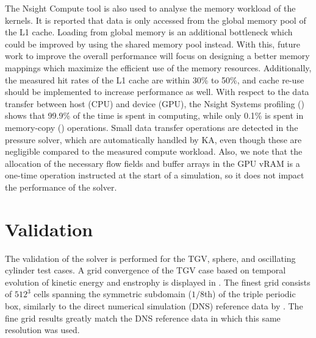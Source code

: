 \documentclass[10pt,a4paper]{article}
\begin{document}
The Nsight Compute tool is also used to analyse the memory workload of the kernels. It is reported that data is only accessed from the global memory pool of the L1 cache. Loading from global memory is an additional bottleneck which could be improved by using the shared memory pool instead. With this, future work to improve the overall performance will focus on designing a better memory mappings which maximize the efficient use of the memory resources. Additionally, the measured hit rates of the L1 cache are within 30\% to 50\%, and cache re-use should be implemented to increase performance as well. With respect to the data transfer between host (CPU) and device (GPU), the Nsight Systems profiling () shows that 99.9\% of the time is spent in computing, while only 0.1\% is spent in memory-copy () operations. Small data transfer operations are detected in the pressure solver, which are automatically handled by KA, even though these are negligible compared to the measured compute workload. Also, we note that the allocation of the necessary flow fields and buffer arrays in the GPU vRAM is a one-time operation instructed at the start of a simulation, so it does not impact the performance of the solver. 

\section{Validation} \label{sec:validation}
The validation of the solver is performed for the TGV, sphere, and oscillating cylinder test cases. A grid convergence of the TGV case based on temporal evolution of kinetic energy and enstrophy is displayed in . The finest grid consists of $512^3$ cells spanning the symmetric subdomain ($1/8$th) of the triple periodic box, similarly to the direct numerical simulation (DNS) reference data by \cite{Dairay2017}. The fine grid results greatly match the DNS reference data in which this same resolution was used.
\end{document}
